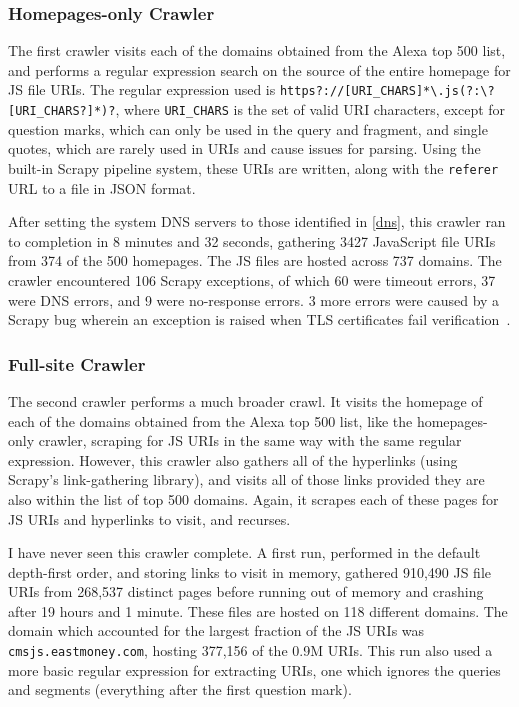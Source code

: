 \subsubsection*{Homepages-only Crawler}\label{homepages-crawler}
The first crawler visits each of the domains obtained from the Alexa top 500 list, and performs a regular expression search on the source of the entire homepage for JS file URIs.
The regular expression used is \texttt{https?://[URI\_CHARS]*\textbackslash{}.js\allowbreak{}(?:\textbackslash{}?[URI\_CHARS?]*)?}, where \texttt{URI\_CHARS} is the set of valid URI characters, except for question marks, which can only be used in the query and fragment, and single quotes, which are rarely used in URIs and cause issues for parsing.
Using the built-in Scrapy pipeline system, these URIs are written, along with the \texttt{referer} URL to a file in JSON format.

After setting the system DNS servers to those identified in \autoref{dns}, this crawler ran to completion in 8 minutes and 32 seconds, gathering 3427 JavaScript file URIs from 374 of the 500 homepages.
The JS files are hosted across 737 domains.
The crawler encountered 106 Scrapy exceptions, of which 60 were timeout errors, 37 were DNS errors, and 9 were no-response errors.
3 more errors were caused by a Scrapy bug wherein an exception is raised when TLS certificates fail verification~\cite{Calderone2015}.
\subsubsection*{Full-site Crawler}\label{full-crawler}
The second crawler performs a much broader crawl.
It visits the homepage of each of the domains obtained from the Alexa top 500 list, like the homepages-only crawler, scraping for JS URIs in the same way with the same regular expression.
However, this crawler also gathers all of the hyperlinks (using Scrapy's link-gathering library), and visits all of those links provided they are also within the list of top 500 domains.
Again, it scrapes each of these pages for JS URIs and hyperlinks to visit, and recurses.

I have never seen this crawler complete.
A first run, performed in the default depth-first order, and storing links to visit in memory, gathered 910,490 JS file URIs from 268,537 distinct pages before running out of memory and crashing after 19 hours and 1 minute.
These files are hosted on 118 different domains.
The domain which accounted for the largest fraction of the JS URIs was \texttt{cmsjs.eastmoney.com}, hosting 377,156 of the 0.9M URIs.
This run also used a more basic regular expression for extracting URIs, one which ignores the queries and segments (everything after the first question mark).


